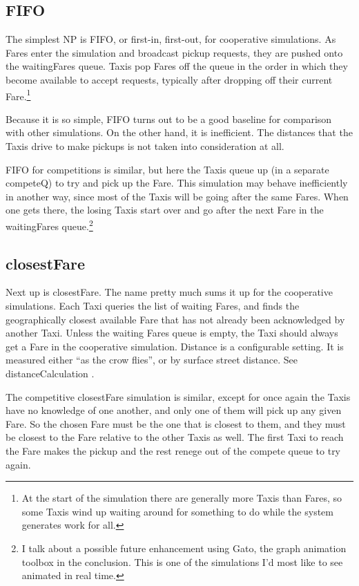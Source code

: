 \documentclass[11pt,letterpaper,onecolumn,twoside,openright,final]{report}
\begin{document}
\subsection{FIFO}
The simplest NP is FIFO, or first-in, first-out, for cooperative simulations.
As Fares enter the simulation and broadcast pickup requests, they are pushed onto the waitingFares queue.
Taxis pop Fares off the queue in the order in which they become available to accept requests, typically after dropping off their current Fare.\footnote{At the start of the simulation there are generally more Taxis than Fares, so some Taxis wind up waiting around for something to do while the system generates work for all.}

Because it is so simple, FIFO turns out to be a good baseline for comparison with other simulations.
On the other hand, it is inefficient.
The distances that the Taxis drive to make pickups is not taken into consideration at all.

FIFO for competitions is similar, but here the Taxis queue up (in a separate competeQ) to try and pick up the Fare.
This simulation may behave inefficiently in another way, since most of the Taxis will be going after the same Fares.
When one gets there, the losing Taxis start over and go after the next Fare in the waitingFares queue.\footnote{I talk about a possible future enhancement using Gato, the graph animation toolbox in the conclusion. This is one of the simulations I'd most like to see animated in real time.}

\subsection{closestFare}
Next up is closestFare.
The name pretty much sums it up for the cooperative simulations.
Each Taxi queries the list of waiting Fares, and finds the geographically closest available Fare that has not already been acknowledged by another Taxi.
Unless the waiting Fares queue is empty, the Taxi should always get a Fare in the cooperative simulation.
Distance is a configurable setting.
It is measured either ``as the crow flies'', or by surface street distance.
See distanceCalculation .

The competitive closestFare simulation is similar, except for once again the Taxis have no knowledge of one another, and only one of them will pick up any given Fare.
So the chosen Fare must be the one that is closest to them, and they must be closest to the Fare relative to the other Taxis as well.
The first Taxi to reach the Fare makes the pickup and the rest renege out of the compete queue to try again.
\end{document}
